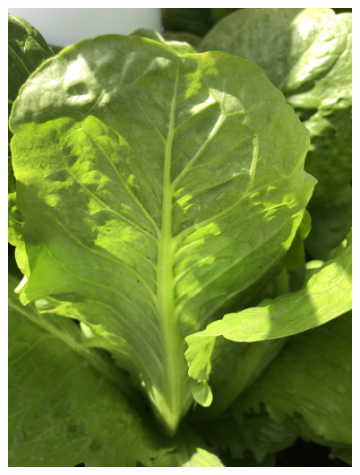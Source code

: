 \documentclass{article}
\begin{document}
\begin{figure}
\begin{subfigure}{0.4\textwidth}
        \includegraphics[width=\textwidth]{images/ds2.jpg}
    \end{subfigure}
    \begin{subfigure}{0.4\textwidth}
        \centering

\end{subfigure}
\end{figure}
\end{document}
